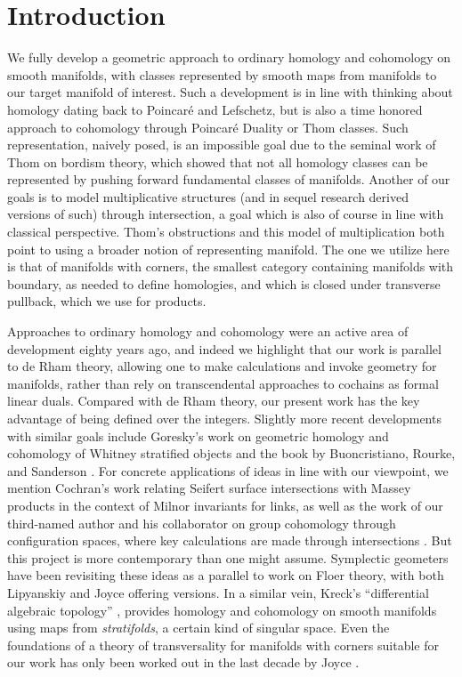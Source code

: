 
\section{Introduction}\label{intro}

We fully develop a geometric approach to ordinary homology and cohomology on smooth manifolds,
with classes represented by smooth maps from manifolds to our target manifold of interest.
Such a development is in line with thinking about homology dating back to Poincar\'e and Lefschetz, but is also a time honored approach to cohomology through Poincar\'e Duality or Thom classes.
Such representation, naively posed, is an impossible goal due to the seminal work of Thom on bordism theory,
which showed that not all homology classes can be represented by pushing forward fundamental classes of manifolds.
Another of our goals is to model multiplicative structures (and in sequel research derived versions of such) through intersection, a goal which is also of course in line with classical perspective.
Thom's obstructions and this model of multiplication both point to using a broader notion of representing manifold.
The one we utilize here is that of manifolds with corners, the smallest category containing manifolds with boundary, as needed to define homologies, and which is closed under transverse pullback, which we use for products.

Approaches to ordinary homology and cohomology were an active area of development eighty years ago, and indeed we highlight that our work is parallel to de Rham theory, allowing one to make calculations and invoke geometry for manifolds, rather than rely on transcendental approaches to cochains as formal linear duals.
Compared with de Rham theory, our present work has the key advantage of being defined over the integers.
Slightly more recent developments with similar goals include Goresky's work on geometric homology and cohomology of Whitney stratified objects \cite{goresky1981stratified} and the book by Buoncristiano, Rourke, and Sanderson \cite{buoncristiano1976homology}.
For concrete applications of ideas in line with our viewpoint, we mention Cochran's work \cite{cochran1990milnor} relating Seifert surface intersections with Massey products in the context of Milnor invariants for links, as well as the work of our third-named author and his collaborator on group cohomology through configuration spaces, where key calculations are made through intersections \cite{giusti2012symmetric, giusti2021alternating}.
But this project is more contemporary than one might assume.
Symplectic geometers have been revisiting these ideas as a parallel to work on Floer theory, with both Lipyanskiy \cite{Lipy14} and Joyce \cite{Joyc15} offering versions.
In a similar vein, Kreck's ``differential algebraic topology'' \cite{Krec10}, provides homology and cohomology on smooth manifolds using maps from \textit{stratifolds}, a certain kind of singular space.
Even the foundations of a theory of transversality for manifolds with corners suitable for our work
has only  been worked out in the last decade by Joyce \cite{Joy12}.

